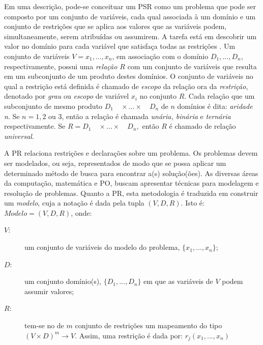 Em uma descrição, pode-se conceituar um PSR como um problema que pode ser composto por um conjunto de variáveis, cada qual associada à um domínio e um conjunto de restrições que se aplica aos valores que as variáveis podem, simultaneamente, serem atribu\'idas ou assumirem. A tarefa está em descobrir um valor no domínio para cada variável que satisfaça todas as restrições \cite{tsang93}. Um conjunto de variáveis $ V = {x_{1},...,x_{n}} $, em associação com o domínio $D_{1},...,D_{n}$, respectivamente, possui uma \textit{relação $R$} com um conjunto de variáveis que resulta em um subconjunto de um produto destes domínios. O conjunto de variáveis no qual a restrição está definida é chamado de \textit{escopo} da relação 
ora da \textit{restriç\~ao}, denotado por  \textit{grau} ou  \textit{escopo} de vari\'avel $x_i$ no conjunto   $R$. Cada relação que um subconjunto de mesmo produto $D_{1} \quad  \times ... \times \quad D_{n}$ de $n$ domínios é dita: \textit{aridade n}. Se $n  = 1, 2 $ ou $3$, então a relação é chamada \textit{unária, binária} e \textit{ternária} respectivamente. Se $R = D_{1}\quad \times ... \times \quad D_{n}, $ ent\~ao $R$ é chamado de relação \textit{universal}. 


A PR  relaciona restrições  e declarações sobre um problema. Os problemas devem ser modelados,  ou seja, representados de modo que se possa aplicar um determinado método de busca para encontrar a(s)  solução(ões). As diversas áreas da computação, matemática e PO, buscam  apresentar  técnicas   para
 modelagem e resolução de problemas. Quanto
a PR, esta metodologia é traduzida em construir um {\em modelo}, cuja a notação é 
dada pela tupla $(V, D, R)$. Isto é: $Modelo = (V, D, R)$, onde:


\begin{description}
\item[$V$:] um conjunto de variáveis do modelo do problema, $\{ x_{1}, ... , x_{n} \}$;

\item[$D$:] um conjunto domínio(s), $\{ D_{1},...,D_{n} \}$ em que as variáveis de $V$ podem assumir valores;

\item[$R$:] tem-se no de $m$ conjunto de restrições  um mapeamento do tipo $(V \times D)^m \rightarrow V$.
 	     Assim, uma restriç\~ao é dada por: $r_j(x_1, ... , x_n)$ 
\end{description}

